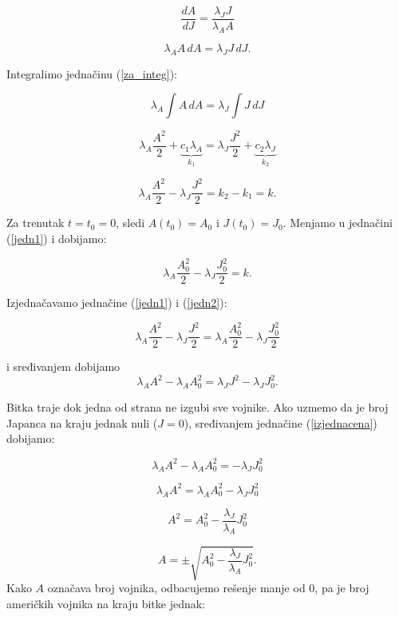 \documentclass{article}
\begin{document}
\[
  \frac{\displaystyle dA}{\displaystyle dJ} = \frac{\displaystyle \lambda_{J}J}{\displaystyle \lambda_{A}A}
\]

\begin{equation}\label{za_integ}
  \lambda_{A}A\,dA = \lambda_{J}J\,dJ.
\end{equation}

Integralimo jednačinu (\ref{za_integ}):

\[
  \lambda_{A}\int{} A\,dA = \lambda_{J} \int{} J\,dJ
\]

\[
  \lambda_{A} \frac{\displaystyle A^2}{\displaystyle 2} + \underbrace{c_1\lambda_{A}}_{k_1}
  = \lambda_{J} \frac{J^2}{2} + \underbrace{c_2\lambda_{J}}_{k_2}
\]

\begin{equation}\label{jedn1}
  \lambda_{A} \frac{A^2}{2} - \lambda_{J} \frac{J^2}{2} = k_2 - k_1 = k.
\end{equation}

Za trenutak \(t = t_0 = 0\), sledi \(A(t_0) = A_0\) i \(J(t_0) = J_0\). Menjamo
u jednačini (\ref{jedn1}) i dobijamo:

\begin{equation}\label{jedn2}
  \lambda_{A}\frac{A_{0}^2}{2} - \lambda_{J}\frac{J_{0}^2}{2} = k.
\end{equation}

Izjednačavamo jednačine (\ref{jedn1}) i (\ref{jedn2}):

\[
  \lambda_{A}\frac{A^2}{2} - \lambda_{J}\frac{J^2}{2} =
\lambda_{A}\frac{A_{0}^2}{2} - \lambda_{J}\frac{J_{0}^2}{2}
\]

i sređivanjem dobijamo
\begin{equation}\label{izjednacena}
  \lambda_{A}A^2 - \lambda_{A}A_{0}^2 = \lambda_{J}J^2 - \lambda_{J}J_{0}^2.
\end{equation}

Bitka traje dok jedna od strana ne izgubi sve vojnike. Ako uzmemo da je broj
Japanca na kraju jednak nuli (\(J = 0\)), sređivanjem jednačine
(\ref{izjednacena}) dobijamo:

\[
  \lambda_{A}A^2 - \lambda_{A}A_{0}^2 = -\lambda_{J}J_{0}^2
\]

\begin{equation}\label{za_uslov}
  \lambda_{A}A^2 = \lambda_{A}A_0^2 - \lambda_{J}J_0^2
\end{equation}

\[
  A^2 = A_{0}^2 - \frac{\lambda_J}{\lambda_A}J_0^2
\]

\[
  A = \pm\sqrt{A_{0}^2 - \frac{\lambda_J}{\lambda_A}J_0^2}.
\]
Kako $A$ označava broj vojnika, odbacujemo rešenje manje od 0, pa je broj američkih vojnika na kraju bitke jednak:
\end{document}
